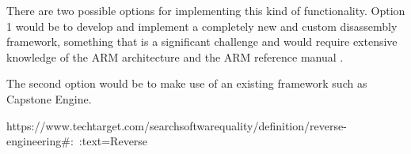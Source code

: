 There are two possible options for implementing this kind of functionality. Option 1 would be to develop and implement a completely new and custom disassembly framework, something that is a significant challenge and would require extensive knowledge of the ARM architecture and the ARM reference manual \cite{}.

The second option would be to make use of an existing framework such as Capstone Engine.










https://www.techtarget.com/searchsoftwarequality/definition/reverse-engineering#:~:text=Reverse%




